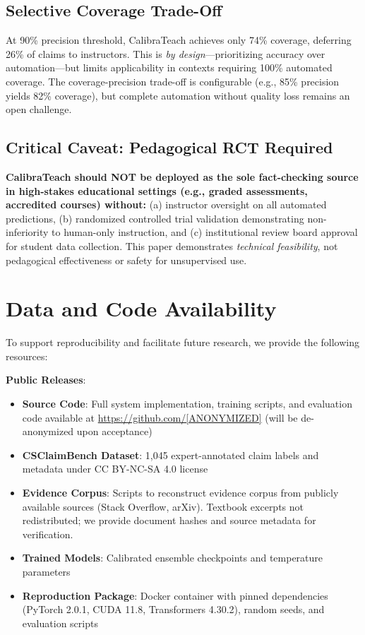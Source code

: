 \documentclass[journal]{IEEEtran}
\begin{document}
\subsection{Selective Coverage Trade-Off}

At 90\% precision threshold, CalibraTeach achieves only 74\% coverage, deferring 26\% of claims to instructors. This is \textit{by design}---prioritizing accuracy over automation---but limits applicability in contexts requiring 100\% automated coverage. The coverage-precision trade-off is configurable (e.g., 85\% precision yields 82\% coverage), but complete automation without quality loss remains an open challenge.

\subsection{Critical Caveat: Pedagogical RCT Required}

\textbf{CalibraTeach should NOT be deployed as the sole fact-checking source in high-stakes educational settings (e.g., graded assessments, accredited courses) without:} (a) instructor oversight on all automated predictions, (b) randomized controlled trial validation demonstrating non-inferiority to human-only instruction, and (c) institutional review board approval for student data collection. This paper demonstrates \textit{technical feasibility}, not pedagogical effectiveness or safety for unsupervised use.


\section{Data and Code Availability}

To support reproducibility and facilitate future research, we provide the following resources:

\textbf{Public Releases}:
\begin{itemize}
    \item \textbf{Source Code}: Full system implementation, training scripts, and evaluation code available at \url{https://github.com/[ANONYMIZED]} (will be de-anonymized upon acceptance)
    \item \textbf{CSClaimBench Dataset}: 1,045 expert-annotated claim labels and metadata under CC BY-NC-SA 4.0 license
    \item \textbf{Evidence Corpus}: Scripts to reconstruct evidence corpus from publicly available sources (Stack Overflow, arXiv). Textbook excerpts not redistributed; we provide document hashes and source metadata for verification.
    \item \textbf{Trained Models}: Calibrated ensemble checkpoints and temperature parameters
    \item \textbf{Reproduction Package}: Docker container with pinned dependencies (PyTorch 2.0.1, CUDA 11.8, Transformers 4.30.2), random seeds, and evaluation scripts
\end{itemize}
\end{document}
